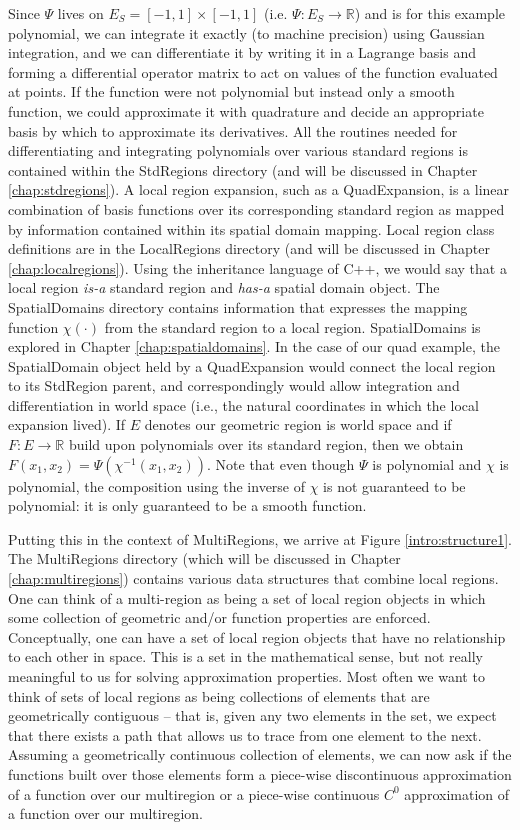 Since $\Psi$ lives on $E_S = [-1,1] \times [-1,1]$ (i.e. $\Psi:E_S\rightarrow\mathbb{R}$) and is for this example polynomial, we can integrate it exactly (to machine precision) using Gaussian integration, and we can differentiate it by writing it in a Lagrange basis and forming a differential operator matrix to act on values of the function evaluated at points.   If the function were not polynomial but instead only a smooth function, we could approximate it with quadrature and decide an appropriate basis by which to 
approximate its derivatives.  All the routines needed for differentiating and integrating polynomials over various standard regions is contained within the StdRegions 
directory (and will be discussed in Chapter \ref{chap:stdregions}).   A local region expansion, such as a QuadExpansion, is a linear combination of basis functions over its corresponding standard region as mapped by
information contained within its spatial domain mapping.  Local region class definitions are in the LocalRegions directory (and will be discussed in Chapter \ref{chap:localregions}).  Using the inheritance language of C++, we would say that a local region {\em is-a} standard region and
{\em has-a} spatial domain object.  The SpatialDomains directory contains information that expresses the mapping function $\chi(\cdot)$ from the standard region
to a local region.  SpatialDomains is explored in Chapter \ref{chap:spatialdomains}.  In the case of our quad example, the SpatialDomain object held by a QuadExpansion would connect the local region to its StdRegion parent,
and correspondingly would allow integration and differentiation in world space (i.e., the natural coordinates in which the local expansion lived).  If $E$ denotes our
geometric region is world space and if $F:E\rightarrow\mathbb{R}$ build upon polynomials over its standard region, then we obtain $F(x_1,x_2) = \Psi(\chi^{-1}(x_1,x_2))$.  Note that even though $\Psi$ is polynomial and $\chi$ is polynomial, the composition using the inverse of $\chi$ is not guaranteed to be polynomial: it is only
guaranteed to be a smooth function. 

Putting this in the context of MultiRegions, we arrive at Figure \ref{intro:structure1}.  The MultiRegions directory (which will be discussed in Chapter \ref{chap:multiregions}) contains various data structures that combine
local regions.  One can think of a multi-region as being a set of local region objects in which some collection of geometric and/or function properties are enforced.
Conceptually, one can have a set of local region objects that have no relationship to each other in space.   This is a set in the mathematical sense, but not really
meaningful to us for solving approximation properties.  Most often we want to think of sets of local regions as being collections of elements that are geometrically
contiguous -- that is, given any two elements in the set, we expect that there exists a path that allows us to trace from one element to the next.   Assuming
a geometrically continuous collection of elements, we can now ask if the functions built over those elements form a piece-wise discontinuous approximation
of a function over our multiregion or a piece-wise continuous $C^0$ approximation of a function over our multiregion.

